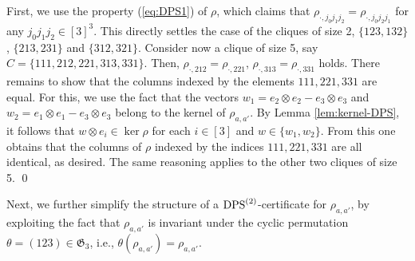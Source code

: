 \documentclass[11pt]{article}
\makeatletter
\newcommand{\C}{\ensuremath{\mathbb{C}}} %
\newcommand{\Perm}{\mathfrak G}
\newcommand{\DPS}{\text{\rm DPS}}
\newcommand{\ot}{\otimes}
\theoremstyle{plain}
\renewenvironment{proof}[1][\proofname]{%
  \par
  \pushQED{}%
  \normalfont
  \topsep6\p@\@plus6\p@
  \trivlist
  \item[\hskip\labelsep\itshape #1\@addpunct{.}]%
}{%
  \popQED
  \endtrivlist
}
\makeatother
\begin{document}
\begin{proof}
First, we use the property (\ref{eq:DPS1}) of $\rho$, which claims that  $\rho_{\cdot, j_0j_1j_2}=\rho_{\cdot, j_0j_2j_1}$ for any $j_0j_1j_2\in[3]^3$. This directly settles the case of the cliques of size 2,  $\{123,132\}$, $\{213,231\}$ and $\{312,321\}$.
Consider now a clique of size 5, say $C=\{111,212,221,313,331\}$. Then, 
$\rho_{\cdot, 212}=\rho_{\cdot, 221}$, $\rho_{\cdot, 313}=\rho_{\cdot,331}$ holds.  There remains to show that the columns indexed by the elements $111,221,331$ are equal.
For this,    we use the fact that %
the vectors $w_1=e_2\ot e_2-e_3\ot e_3$ and $w_2=e_1\ot e_1-e_3\ot e_3$  belong to the kernel of $\rho_{a,a'}$. By Lemma \ref{lem:kernel-DPS},
   it follows that $w\ot e_i\in \ker \rho$ %
   for each $i\in [3]$ and $w\in\{w_1,w_2\}$.
From this one obtains that the columns of $\rho$ indexed by the indices $111, 221, 331$ are all identical, as desired.
The same reasoning applies to the other two cliques of size 5.
\qed\end{proof}

Next, we further simplify the structure of a $\DPS^{(2)}$-certificate for $\rho_{a,a'}$, by exploiting the fact that $\rho_{a,a'}$ is invariant under the cyclic permutation $\theta=(123)\in\Perm_3$, i.e., $\theta(\rho_{a,a'})=\rho_{a,a'}$.
\end{document}
